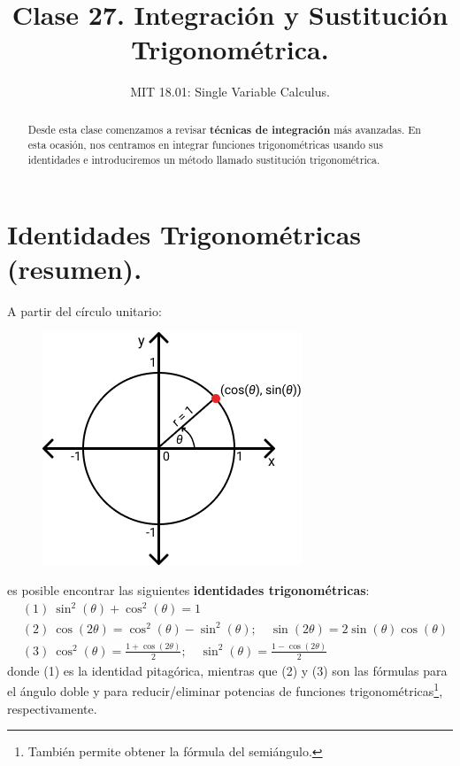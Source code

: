 \documentclass[12pt]{article}
\title{Clase 27. Integración y Sustitución Trigonométrica.}
\author{MIT 18.01: Single Variable Calculus.}
\date{}
\begin{document}
\maketitle


\begin{abstract}
\noindent Desde esta clase comenzamos a revisar \textbf{técnicas de integración} más avanzadas. En esta ocasión, nos centramos en integrar funciones trigonométricas usando sus identidades e introduciremos un método llamado sustitución trigonométrica.
\end{abstract}


\section{Identidades Trigonométricas (resumen).}

A partir del círculo unitario:

\begin{figure}[hbt!]
\centering
\includegraphics[scale=0.6]{img/trig-unit-circle.jpg}
\end{figure}

es posible encontrar las siguientes \textbf{identidades trigonométricas}:
\begin{align*}
&(1) \ \sin^{2}(\theta) + \cos^{2}(\theta) = 1 \\
&(2) \ \cos(2\theta) = \cos^{2}(\theta) - \sin^{2}(\theta); \quad \sin(2\theta) = 2\sin(\theta)\cos(\theta) \\
&(3) \ \cos^{2}(\theta) = \frac{1 + \cos(2\theta)}{2}; \quad \sin^{2}(\theta) = \frac{1 - \cos(2\theta)}{2}
\end{align*}
donde (1) es la identidad pitagórica, mientras que (2) y (3) son las fórmulas para el ángulo doble y para reducir/eliminar potencias de funciones trigonométricas\footnote{También permite obtener la fórmula del semiángulo.}, respectivamente.
\end{document}
